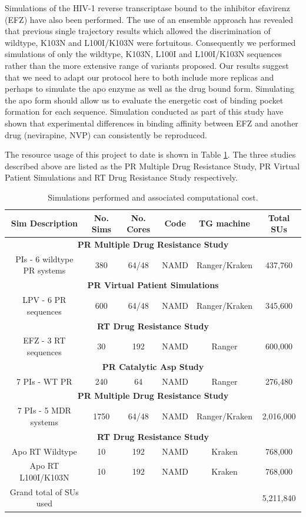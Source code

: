 \documentclass[a4paper,10pt]{article}
\begin{document}
Simulations of the HIV-1 reverse transcriptase bound to the inhibitor efavirenz (EFZ) have also 
been performed. The use of an ensemble approach has revealed that previous single trajectory results 
which allowed the discrimination of wildtype, K103N and L100I/K103N were fortuitous. Consequently we 
performed simulations of only the wildtype, K103N, L100I and L100I/K103N sequences rather than the 
more extensive range of variants proposed. Our results suggest that we need to adapt our protocol here 
to both include more replicas and perhaps to simulate the apo enzyme as well as the drug bound form. 
Simulating the apo form should allow us to evaluate the energetic cost of binding pocket formation 
for each sequence. Simulation conducted as part of this study have shown that experimental differences 
in binding affinity between EFZ and another drug (nevirapine, NVP) can consistently be reproduced.

The resource usage of this project to date is shown in Table \ref{t:hiv_used}. The three studies 
described above are listed as the PR Multiple Drug Resistance Study, PR Virtual Patient Simulations 
and RT Drug Resistance Study respectively.

\begin{table}[h]

\centering
\begin{tabular}[b]
{|c|c|c|c|c|c|}
\hline
\textbf{Sim Description} & \textbf{No. Sims} & \textbf{No. Cores} & \textbf{Code} & \textbf{TG machine} & \textbf{Total SUs}\\
\hline
\multicolumn{6}{|c|}{\textbf{PR Multiple Drug Resistance Study}}\\
\hline
PIs - 6 wildtype PR systems & 380 & 64/48 & NAMD & Ranger/Kraken & 437,760 \\
\hline
\multicolumn{6}{|c|}{\textbf{PR Virtual Patient Simulations}}\\
\hline
LPV - 6 PR sequences & 600 & 64/48 & NAMD & Ranger/Kraken & 345,600 \\
\hline
\multicolumn{6}{|c|}{\textbf{RT Drug Resistance Study}}\\
\hline
EFZ - 3 RT sequences & 30 & 192 & NAMD & Ranger & 600,000\\
\hline
\multicolumn{6}{|c|}{\textbf{PR Catalytic Asp Study}}\\
\hline
7 PIs - WT PR & 240 & 64 & NAMD & Ranger & 276,480 \\
\hline
\multicolumn{6}{|c|}{\textbf{PR Multiple Drug Resistance Study}}\\
\hline
7 PIs - 5 MDR systems & 1750 & 64/48 & NAMD & Ranger/Kraken & 2,016,000 \\
\hline
\multicolumn{6}{|c|}{\textbf{RT Drug Resistance Study}}\\
\hline
Apo RT Wildtype & 10 & 192  & NAMD & Kraken & 768,000\\
\hline
Apo RT L100I/K103N & 10 & 192 & NAMD & Kraken & 768,000\\
\hline
Grand total of SUs used & & & & & 5,211,840 \\
\hline
\end{tabular} \caption{Simulations performed and associated computational cost.}
\label{t:hiv_used}
\end{table}
\end{document}
